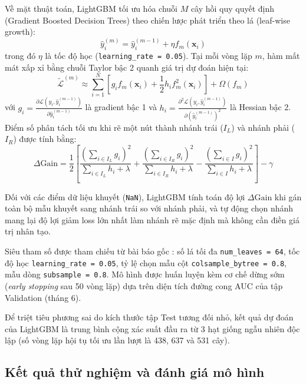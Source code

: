 Về mặt thuật toán, LightGBM tối ưu hóa chuỗi $M$ cây hồi quy quyết định (Gradient Boosted Decision Trees) theo chiến lược phát triển theo lá (leaf-wise growth):
\begin{equation}
  \hat{y}_i^{(m)} = \hat{y}_i^{(m-1)} + \eta f_m(\mathbf{x}_i)
  \label{eq:lgb_additive}
\end{equation}
trong đó $\eta$ là tốc độ học (\texttt{learning\_rate = 0.05}). Tại mỗi vòng lặp $m$, hàm mất mát xấp xỉ bằng chuỗi Taylor bậc 2 quanh giá trị dự đoán hiện tại:
\begin{equation}
  \tilde{\mathcal{L}}^{(m)} \approx \sum_{i=1}^{N} \left[ g_i f_m(\mathbf{x}_i) + \frac{1}{2} h_i f_m^2(\mathbf{x}_i) \right] + \Omega(f_m)
  \label{eq:lgb_taylor}
\end{equation}
với $g_i = \frac{\partial \mathcal{L}(y_i, \hat{y}_i^{(m-1)})}{\partial \hat{y}_i^{(m-1)}}$ là gradient bậc 1 và $h_i = \frac{\partial^2 \mathcal{L}(y_i, \hat{y}_i^{(m-1)})}{\partial (\hat{y}_i^{(m-1)})^2}$ là Hessian bậc 2. Điểm số phân tách tối ưu khi rẽ một nút thành nhánh trái ($I_L$) và nhánh phải ($I_R$) được tính bằng:
\begin{equation}
  \Delta \text{Gain} = \frac{1}{2} \left[ \frac{\left(\sum_{i \in I_L} g_i\right)^2}{\sum_{i \in I_L} h_i + \lambda} + \frac{\left(\sum_{i \in I_R} g_i\right)^2}{\sum_{i \in I_R} h_i + \lambda} - \frac{\left(\sum_{i \in I} g_i\right)^2}{\sum_{i \in I} h_i + \lambda} \right] - \gamma
  \label{eq:lgb_gain}
\end{equation}

Đối với các điểm dữ liệu khuyết (\texttt{NaN}), LightGBM tính toán độ lợi $\Delta \text{Gain}$ khi gán toàn bộ mẫu khuyết sang nhánh trái so với nhánh phải, và tự động chọn nhánh mang lại độ lợi giảm loss lớn nhất làm nhánh rẽ mặc định mà không cần điền giá trị nhân tạo.

Siêu tham số được tham chiếu từ bài báo gốc \cite{jesus2022turning}: số lá tối đa \texttt{num\_leaves = 64}, tốc độ học \texttt{learning\_rate = 0.05}, tỷ lệ chọn mẫu cột \texttt{colsample\_bytree = 0.8}, mẫu dòng \texttt{subsample = 0.8}. Mô hình được huấn luyện kèm cơ chế dừng sớm (\textit{early stopping} sau 50 vòng lặp) dựa trên diện tích đường cong AUC của tập Validation (tháng 6).

Để triệt tiêu phương sai do kích thước tập Test tương đối nhỏ, kết quả dự đoán của LightGBM là trung bình cộng xác suất đầu ra từ 3 hạt giống ngẫu nhiên độc lập (số vòng lặp hội tụ tối ưu lần lượt là 438, 637 và 531 cây).

\subsection{Kết quả thử nghiệm và đánh giá mô hình}
\label{subsec:tab_experiments}

